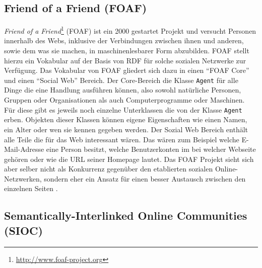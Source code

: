 

\subsection{Friend of a Friend (FOAF)} %
\label{sub:friend_of_a_friend_}

\emph{Friend of a Friend}\footnote{\url{http://www.foaf-project.org}} (FOAF) ist ein 2000 gestartet Projekt und versucht Personen innerhalb des Webs, inklusive der Verbindungen zwischen ihnen und anderen, sowie dem was sie machen, in maschinenlesbarer Form abzubilden. FOAF stellt hierzu ein Vokabular \cite{Brickley2010} auf der Basis von RDF für solche sozialen Netzwerke zur Verfügung. Das Vokabular von FOAF gliedert sich dazu in einen \enquote{FOAF Core} und einen \enquote{Social Web} Bereich. Der Core-Bereich die Klasse \texttt{Agent} für alle Dinge die eine Handlung ausführen können, also sowohl natürliche Personen, Gruppen oder Organisationen als auch Computerprogramme oder Maschinen. Für diese gibt es jeweils noch einzelne Unterklassen die von der Klasse \texttt{Agent} erben. Objekten dieser Klassen können eigene Eigenschaften wie einen Namen, ein Alter oder wen sie kennen gegeben werden. Der Sozial Web Bereich enthält alle Teile die für das Web interessant wären. Das wären zum Beispiel welche E-Mail-Adresse eine Person besitzt, welche Benutzerkonten im bei welcher Webseite gehören oder wie die URL seiner Homepage lautet. Das FOAF Projekt sieht sich aber selber nicht als Konkurrenz gegenüber den etablierten sozialen Online-Netzwerken, sondern eher ein Ansatz für einen besser Austausch zwischen den einzelnen Seiten \cite[Abstract]{Brickley2010}.


\subsection{Semantically-Interlinked Online Communities (SIOC)} %
\label{sub:semantically_interlinked_online_communities}


